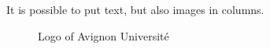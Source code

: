 \documentclass[10pt,    %
    english,            %
    xcolor=table,       %
    envcountsect,       %
    aspectratio=43      %
]{beamer}
\begin{document}
\begin{frame}
\begin{columns}[T,totalwidth=\textwidth]
        \begin{column}{0.33\textwidth}
            It is possible to put text, but also images in columns.
            \begin{figure}[H]
                \centering
                \href{http://univ-avignon.fr}{}
                \vspace{-0.5cm}
                \caption{Logo of Avignon Université}
                \label{fig:AUlogo}
            \end{figure}
        \end{column}
    \end{columns}
    
        
\end{frame}
\end{document}
